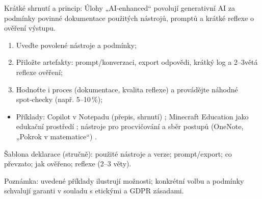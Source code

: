 Krátké shrnutí a princip: Úlohy „AI‑enhanced“ povolují generativní AI za podmínky povinné dokumentace použitých nástrojů, promptů a krátké reflexe o ověření výstupu.

\begin{enumerate}
\item Uveďte povolené nástroje a podmínky;
\item Přiložte artefakty: prompt/konverzaci, export odpovědi, krátký log a 2–3větá reflexe ověření;
\item Hodnoťte i proces (dokumentace, kvalita reflexe) a provádějte náhodné spot‑checky (např. 5–10\,\%);
\end{enumerate}

\begin{itemize}\item Příklady: Copilot v Notepadu (přepis, shrnutí) \cite{kb_ai_101_tipu_pdf_04e4a115_page_14_1}; Minecraft Education jako edukační prostředí \cite{kb_ai_101_tipu_pdf_04e4a115_page_15_2}; nástroje pro procvičování a sběr postupů (OneNote, „Pokrok v matematice“) \cite{kb_ai_101_tipu_pdf_04e4a115_page_8_1}.\end{itemize}

Šablona deklarace (stručně): použité nástroje a verze; prompt/export; co převzato; jak ověřeno; reflexe (2–3 věty).

Poznámka: uvedené příklady ilustrují možnosti; konkrétní volbu a podmínky schvalují garanti v souladu s etickými a GDPR zásadami.